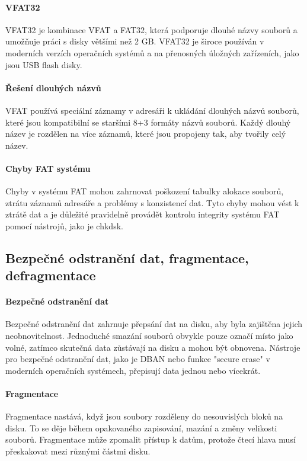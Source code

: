 \paragraph{VFAT32}
VFAT32 je kombinace VFAT a FAT32, která podporuje dlouhé názvy souborů a umožňuje práci s disky většími než 2 GB. VFAT32 je široce používán v moderních verzích operačních systémů a na přenosných úložných zařízeních, jako jsou USB flash disky.

\paragraph{Řešení dlouhých názvů}
VFAT používá speciální záznamy v adresáři k ukládání dlouhých názvů souborů, které jsou kompatibilní se staršími 8+3 formáty názvů souborů. Každý dlouhý název je rozdělen na více záznamů, které jsou propojeny tak, aby tvořily celý název.

\paragraph{Chyby FAT systému}
Chyby v systému FAT mohou zahrnovat poškození tabulky alokace souborů, ztrátu záznamů adresáře a problémy s konzistencí dat. Tyto chyby mohou vést k ztrátě dat a je důležité pravidelně provádět kontrolu integrity systému FAT pomocí nástrojů, jako je chkdsk.

\subsection{Bezpečné odstranění dat, fragmentace, defragmentace}
\paragraph{Bezpečné odstranění dat}
Bezpečné odstranění dat zahrnuje přepsání dat na disku, aby byla zajištěna jejich neobnovitelnost. Jednoduché smazání souborů obvykle pouze označí místo jako volné, zatímco skutečná data zůstávají na disku a mohou být obnovena. Nástroje pro bezpečné odstranění dat, jako je DBAN nebo funkce "secure erase" v moderních operačních systémech, přepisují data jednou nebo vícekrát.

\paragraph{Fragmentace}
Fragmentace nastává, když jsou soubory rozděleny do nesouvislých bloků na disku. To se děje během opakovaného zapisování, mazání a změny velikosti souborů. Fragmentace může zpomalit přístup k datům, protože čtecí hlava musí přeskakovat mezi různými částmi disku.

